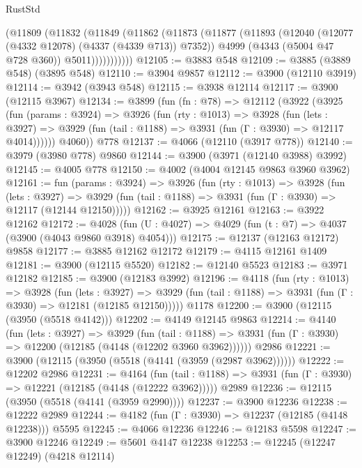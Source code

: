 \begin{lexlean}{RustStd}
\begin{coremodule}
            (@11809
              (@11832
                (@11849
                  (@11862
                    (@11873
                      (@11877
                        (@11893
                          (@12040 (@12077 (@4332 @12078) (@4337 (@4339 @713)) @7352))
                          @4999
                          (@4343 (@5004 @47 @728 @360))
                          @5011)))))))))))
@12105 := @3883 @548
@12109 := @3885 (@3889 @548) (@3895 @548)
@12110 := @3904 @9857
@12112 := @3900 (@12110 @3919)
@12114 := @3942 (@3943 @548)
@12115 := @3938 @12114
@12117 := @3900 (@12115 @3967)
@12134 := @3899
    (fun (fn : @78) =>
    @12112
      (@3922
        (@3925
          (fun (params : @3924) =>
          @3926
            (fun (rty : @1013) =>
            @3928
              (fun (lets : @3927) =>
              @3929 (fun (tail : @1188) => @3931 (fun (Γ : @3930) => @12117 @4014))))))
        @4060))
    @778
@12137 := @4066 (@12110 (@3917 @778))
@12140 := @3979 (@3980 @778) @9860
@12144 := @3900 (@3971 (@12140 @3988) @3992)
@12145 := @4005 @778
@12150 := @4002 (@4004 @12145 @9863 @3960 @3962)
@12161 := fun (params : @3924) =>
  @3926
    (fun (rty : @1013) =>
    @3928
      (fun (lets : @3927) =>
      @3929 (fun (tail : @1188) => @3931 (fun (Γ : @3930) => @12117 (@12144 @12150)))))
@12162 := @3925 @12161
@12163 := @3922 @12162
@12172 := @4028 (fun (U : @4027) => @4029 (fun (t : @7) => @4037 (@3900 (@4043 @9860 @3918) @4054)))
@12175 := @12137 (@12163 @12172) @9858
@12177 := @3885 @12162 @12172
@12179 := @4115 @12161 @1409
@12181 := @3900 (@12115 @5520)
@12182 := @12140 @5523
@12183 := @3971 @12182
@12185 := @3900 (@12183 @3992)
@12196 := @4118
    (fun (rty : @1013) =>
    @3928
      (fun (lets : @3927) =>
      @3929 (fun (tail : @1188) => @3931 (fun (Γ : @3930) => @12181 (@12185 @12150)))))
    @1178
@12200 := @3900 (@12115 (@3950 (@5518 @4142)))
@12202 := @4149 @12145 @9863
@12214 := @4140
    (fun (lets : @3927) =>
    @3929
      (fun (tail : @1188) =>
      @3931 (fun (Γ : @3930) => @12200 (@12185 (@4148 (@12202 @3960 @3962))))))
    @2986
@12221 := @3900 (@12115 (@3950 (@5518 (@4141 (@3959 (@2987 @3962))))))
@12222 := @12202 @2986
@12231 := @4164
    (fun (tail : @1188) => @3931 (fun (Γ : @3930) => @12221 (@12185 (@4148 (@12222 @3962)))))
    @2989
@12236 := @12115 (@3950 (@5518 (@4141 (@3959 @2990))))
@12237 := @3900 @12236
@12238 := @12222 @2989
@12244 := @4182 (fun (Γ : @3930) => @12237 (@12185 (@4148 @12238))) @5595
@12245 := @4066 @12236
@12246 := @12183 @5598
@12247 := @3900 @12246
@12249 := @5601 @4147 @12238
@12253 := @12245 (@12247 @12249) (@4218 @12114)

\end{coremodule}
\end{lexlean}

